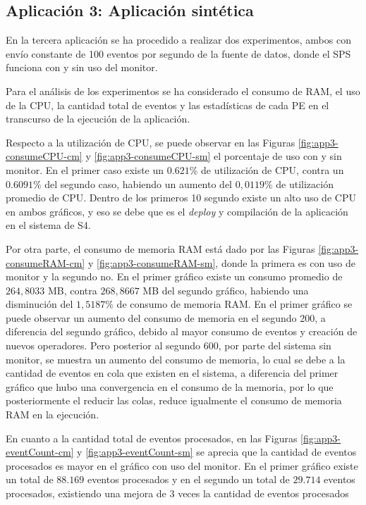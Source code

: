 \subsection{Aplicación 3: Aplicación sintética}
En la tercera aplicación se ha procedido a realizar dos experimentos, ambos con envío constante de 100 eventos por segundo de la fuente de datos, donde el SPS funciona con y sin uso del monitor.

Para el análisis de los experimentos se ha considerado el consumo de RAM, el uso de la CPU, la cantidad total de eventos y las estadísticas de cada PE en el transcurso de la ejecución de la aplicación.

Respecto a la utilización de CPU, se puede observar en las Figuras \ref{fig:app3-consumeCPU-cm} y \ref{fig:app3-consumeCPU-sm} el porcentaje de uso con y sin monitor. En el primer caso existe un $0.621\%$ de utilización de CPU, contra un $0.6091\%$ del segundo caso, habiendo un aumento del $0,0119\%$ de utilización promedio de CPU. Dentro de los primeros 10 segundo existe un alto uso de CPU en ambos gráficos, y eso se debe que es el \textit{deploy} y compilación de la aplicación en el sistema de S4.

Por otra parte, el consumo de memoria RAM está dado por las Figuras \ref{fig:app3-consumeRAM-cm} y \ref{fig:app3-consumeRAM-sm}, donde la primera es con uso de monitor y la segundo no. En el primer gráfico existe un consumo promedio de $264,8033$ MB, contra $268,8667$ MB del segundo gráfico, habiendo una disminución del $1,5187\%$ de consumo de memoria RAM. En el primer gráfico se puede observar un aumento del consumo de memoria en el segundo 200, a diferencia del segundo gráfico, debido al mayor consumo de eventos y creación de nuevos operadores. Pero posterior al segundo 600, por parte del sistema sin monitor, se muestra un aumento del consumo de memoria, lo cual se debe a la cantidad de eventos en cola que existen en el sistema, a diferencia del primer gráfico que hubo una convergencia en el consumo de la memoria, por lo que posteriormente el reducir las colas, reduce igualmente el consumo de memoria RAM en la ejecución.

En cuanto a la cantidad total de eventos procesados, en las Figuras \ref{fig:app3-eventCount-cm} y \ref{fig:app3-eventCount-sm} se aprecia que la cantidad de eventos procesados es mayor en el gráfico con uso del monitor. En el primer gráfico existe un total de $88.169$ eventos procesados y en el segundo un total de $29.714$ eventos procesados, existiendo una mejora de 3 veces la cantidad de eventos procesados

